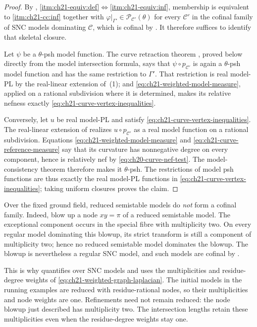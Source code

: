 \begin{proof}
By ,
\cref{itm:ch21-equiv:def}$\Leftrightarrow$\cref{itm:ch21-equiv:inf}, membership is
equivalent to \cref{itm:ch21-cc:inf} together with
$\varphi|_{\Gamma'}\in\mathcal P_{\mathcal C'}(\theta)$ for every
$\mathcal C'$ in the cofinal family of SNC models dominating
$\mathcal C$, which is cofinal by .  It therefore
suffices to identify that skeletal closure.

Let $\psi$ be a $\theta$-psh model function.  The curve retraction
theorem , proved below directly from the
model intersection formula, says that
$\psi\circ p_{\mathcal C'}$ is again a $\theta$-psh model function and
has the same restriction to $\Gamma'$.  That restriction is real model-PL
by the real-linear extension of
\,(1); and
\eqref{eq:ch21-weighted-model-measure}, applied on a rational subdivision
where it is determined, makes its relative nefness exactly
\eqref{eq:ch21-curve-vertex-inequalities}.

Conversely, let $u$ be real model-PL and satisfy
\eqref{eq:ch21-curve-vertex-inequalities}.  The real-linear extension of
 realizes $u\circ p_{\mathcal C'}$ as a
real model function on a rational subdivision.  Equations
\eqref{eq:ch21-weighted-model-measure} and
\eqref{eq:ch21-curve-reference-measure} say that its curvature has
nonnegative degree on every component, hence is relatively nef by
\eqref{eq:ch20-curve-nef-test}.  The model-consistency theorem
 therefore makes it $\theta$-psh.
The restrictions of model psh functions are thus exactly the real model-PL
functions in \eqref{eq:ch21-curve-vertex-inequalities}; taking uniform
closures proves the claim.
\end{proof}

\begin{remark}
\label{rem:ch21-semistable-not-cofinal}
Over the fixed ground field, reduced semistable models do \emph{not} form a
cofinal family.  Indeed, blow up a node $xy=\pi$ of a reduced semistable
model.  The exceptional component occurs in the special fibre with
multiplicity two.  On every regular model dominating this blowup, its strict
transform is still a component of multiplicity two; hence no reduced
semistable model dominates the blowup.  The blowup is nevertheless a regular
SNC model, and such models are cofinal by .

This is why  quantifies over SNC models and
uses the multiplicities and residue-degree weights of
\eqref{eq:ch21-weighted-graph-laplacian}.  The initial models in the running examples are reduced with
residue-rational nodes, so their multiplicities and node weights are one.
Refinements need not remain reduced: the node blowup just described has
multiplicity two.  The intersection lengths retain these multiplicities
even when the residue-degree weights stay one.
\end{remark}

